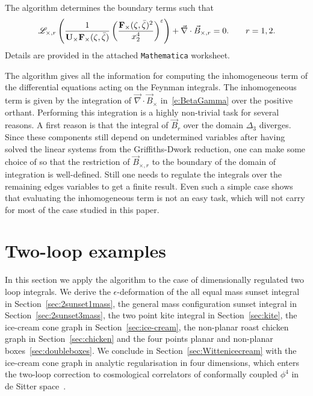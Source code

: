 \documentclass[a4paper,12pt]{article}
\numberwithin{equation}{section}
\numberwithin{figure}{section}
\begin{document}
 The algorithm determines the boundary terms 
 such that
 \begin{equation}
   \mathscr{L}_{\times,r}    \left( {1\over \textbf{U}_\times
    \textbf{F}_\times (\zeta,\bar\zeta)} \left(
    \textbf{F}_\times (\zeta,\bar\zeta)^{2}\over
    x_2^{4}\right)^\varepsilon \right)+ \vec\nabla\cdot\vec B_{\times,r}=0.
\qquad r=1,2.
\end{equation}
%
Details are provided in the  attached {\tt Mathematica} worksheet. 




The algorithm gives all the information for computing the
inhomogeneous term of the differential equations acting on the Feynman
integrals. The inhomogeneous term  is given by the  integration of
$\vec\nabla\cdot \vec B_\times$ in~\eqref{e:BetaGamma}  over the
positive orthant. Performing this integration is a highly non-trivial
task for several reasons. A first reason is that the integral of $\vec B_r$
over the domain $\Delta_3$ diverges.
Since these components still
depend on undetermined variables  after having solved the linear systems from the
Griffiths-Dwork reduction, one can make some choice of so that the
restriction of $\vec B_{\times,r}$ to the boundary of the domain of integration
is well-defined. Still one needs to regulate the integrals over the
remaining edges variables  to get a finite
result.
Even such a simple case shows that evaluating the
inhomogeneous term is not an easy task, which will not carry for most
of the case studied in this paper. 


\section{Two-loop examples}\label{sec:twoloop}
%
In this section we apply the algorithm to  the case of dimensionally
 regulated two loop integrals. We derive the $\epsilon$-deformation of
the all equal mass sunset integral in Section~\ref{sec:2sunset1mass}, the general mass configuration
sunset integral in Section~\ref{sec:2sunset3mass}, the two point kite
integral in Section~\ref{sec:kite}, the ice-cream cone
graph in Section~\ref{sec:ice-cream}, the non-planar roast chicken
graph in Section~\ref{sec:chicken} and the four points planar
and non-planar boxes~\ref{sec:doubleboxes}. We conclude in  Section~\ref{sec:Wittenicecream}
with the ice-cream cone graph in  analytic regularisation in four
dimensions, which enters the two-loop correction to cosmological
correlators of  conformally coupled $\phi^4$  in  de
 Sitter space~\cite{Chowdhury:2023arc}.
\end{document}
